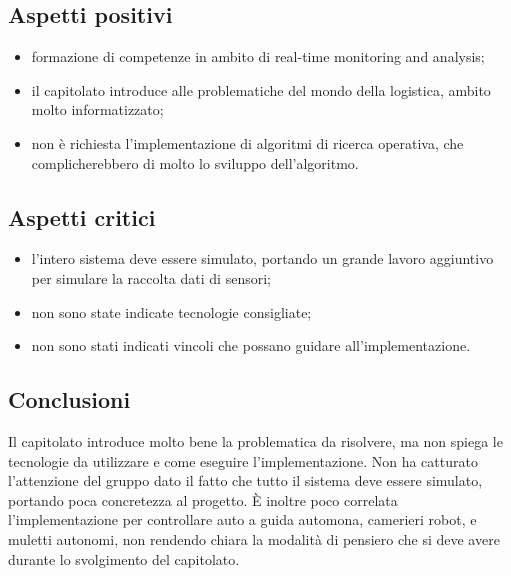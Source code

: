 \subsection{Aspetti positivi}
\begin{itemize}
    \item formazione di competenze in ambito di real-time monitoring and analysis;
    \item il capitolato introduce alle problematiche del mondo della logistica, ambito molto informatizzato;
    \item non è richiesta l'implementazione di algoritmi di ricerca operativa, che complicherebbero di molto lo sviluppo dell'algoritmo.
\end{itemize}
\subsection{Aspetti critici}
\begin{itemize}
    \item l'intero sistema deve essere simulato, portando un grande lavoro aggiuntivo per simulare la raccolta dati di sensori;
    \item non sono state indicate tecnologie consigliate;
    \item non sono stati indicati vincoli che possano guidare all'implementazione.
\end{itemize}
\subsection{Conclusioni}
Il capitolato introduce molto bene la problematica da risolvere, ma non spiega le tecnologie da utilizzare e come eseguire l'implementazione.
Non ha catturato l'attenzione del gruppo dato il fatto che tutto il sistema deve essere simulato, portando poca concretezza al progetto.
È inoltre poco correlata l'implementazione per controllare auto a guida automona, camerieri robot, e muletti autonomi, non rendendo chiara la modalità di pensiero che si deve avere durante lo svolgimento del capitolato.